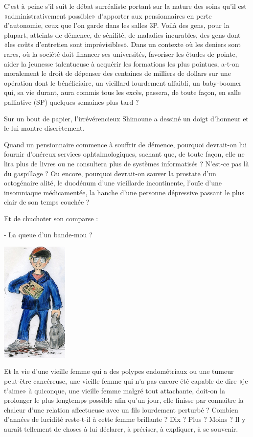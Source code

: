 C’est à peine s’il suit le débat surréaliste portant sur la nature des soins qu’il est «administrativement possible» d’apporter aux pensionnaires en perte d’autonomie, ceux que l’on garde dans les salles 3P. Voilà des gens, pour la plupart, atteints de démence, de sénilité, de maladies incurables, des gens dont «les coûts d’entretien sont imprévisibles». Dans un contexte où les deniers sont rares, où la société doit financer ses universités, favoriser les études de pointe, aider la jeunesse talentueuse à acquérir les formations les plus pointues, a-t-on moralement le droit de dépenser des centaines de milliers de dollars sur une opération dont le bénéficiaire, un vieillard lourdement affaibli, un baby-boomer qui, sa vie durant, aura commis tous les excès, passera, de toute façon, en salle palliative (SP) quelques semaines plus tard ?

Sur un bout de papier, l’irrévérencieux Shimoune a dessiné un doigt d’honneur et le lui montre discrètement.

Quand un pensionnaire commence à souffrir de démence, pourquoi devrait-on lui fournir d’onéreux services ophtalmologiques, sachant que, de toute façon, elle ne lira plus de livres ou ne consultera plus de systèmes informatisés ? N’est-ce pas là du gaspillage ? Ou encore, pourquoi devrait-on sauver la prostate d’un octogénaire alité, le duodénum d’une vieillarde incontinente, l’ouïe d’une insomniaque médicamentée, la hanche d’une personne dépressive passant le plus clair de son temps couchée ?

Et de chuchoter son comparse :

- La queue d’un bande-mou ?

\begin{floatingfigure}[l]{40mm}
\includegraphics[height=60mm]{corps/chapitre8/img/personnage-timothee-jeune.jpg}
\end{floatingfigure}

Et la vie d’une vieille femme qui a des polypes endométriaux ou une tumeur peut-être cancéreuse, une vieille femme qui n’a pas encore été capable de dire «je t’aime» à quiconque, une vieille femme malgré tout attachante, doit-on la prolonger le plus longtemps possible afin qu’un jour, elle finisse par connaître la chaleur d’une relation affectueuse avec un fils lourdement perturbé ? Combien d’années de lucidité reste-t-il à cette femme brillante ? Dix ? Plus ? Moins ? Il y aurait tellement de choses à lui déclarer, à préciser, à expliquer, à se souvenir.


